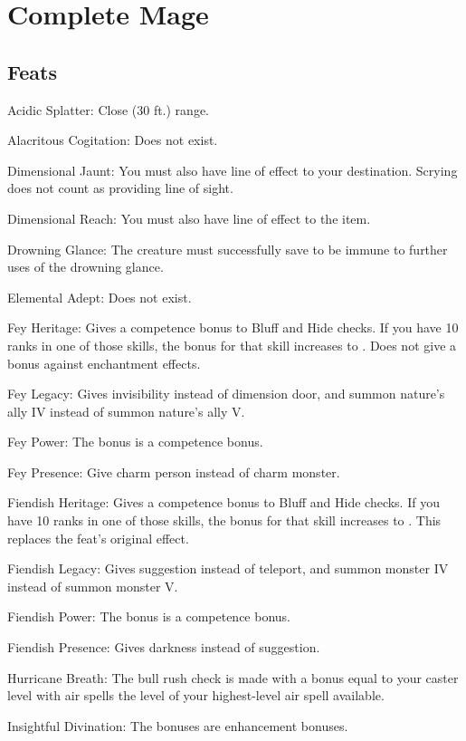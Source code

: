 \section{Complete Mage}
\subsection{Feats}
\begin{itemize*}
\item Acidic Splatter: Close (30 ft.) range.
\item Alacritous Cogitation: Does not exist.
\item Dimensional Jaunt: You must also have line of effect to your destination. Scrying does not count as providing line of sight.
\item Dimensional Reach: You must also have line of effect to the item.
\item Drowning Glance: The creature must successfully save to be immune to further uses of the drowning glance.
\item Elemental Adept: Does not exist.
\item Fey Heritage: Gives a  competence bonus to Bluff and Hide checks. If you have 10 ranks in one of those skills, the bonus for that skill increases to . Does not give a bonus against enchantment effects.
\item Fey Legacy: Gives invisibility instead of dimension door, and summon nature's ally IV instead of summon nature's ally V.
\item Fey Power: The bonus is a competence bonus.
\item Fey Presence: Give charm person instead of charm monster.
\item Fiendish Heritage: Gives a  competence bonus to Bluff and Hide checks. If you have 10 ranks in one of those skills, the bonus for that skill increases to . This replaces the feat's original effect.
\item Fiendish Legacy: Gives suggestion instead of teleport, and summon monster IV instead of summon monster V.
\item Fiendish Power: The bonus is a competence bonus.
\item Fiendish Presence: Gives darkness instead of suggestion.
\item Hurricane Breath: The bull rush check is made with a bonus equal to your caster level with air spells \add the level of your highest-level air spell available.
\item Insightful Divination: The bonuses are enhancement bonuses.

\end{itemize*}
